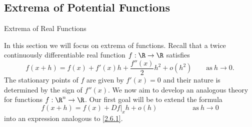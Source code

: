 \documentclass[smaller,hyperref={CJKbookmarks=true}]{beamer}
\begin{document}
\subsection{Extrema of Potential Functions}
\begin{frame}[c]
\begin{spacing}{2.5}
\tableofcontents[sectionstyle=hide,subsectionstyle=show/shaded/hide]
\end{spacing}
\end{frame}
\begin{frame}[c]{Extrema of Real Functions}
\begin{spacing}{1.05}
In this section we will focus on extrema of functions. Recall that a twice
continuously dif{}ferentiable real function $f:\R\to\R$ satisfies
\setcounter{equation}{0}
\begin{equation}\label{2.6.1}
  f(x+h)=f(x)+f'(x)h+\frac{f''(x)}{2}h^2+o(h^2)
  \qquad\text{as}~h\to0.
\end{equation}
The stationary points of $f$ are given by $f'(x)=0$ and their nature is determined by the sign of $f''(x)$. We now aim to develop an analogous theory for functions $f:\R^n\to\R$. Our first goal will be to extend the formula
\[f(x+h)=f(x)+Df|_xh+o(h)\qquad\qquad\quad
\text{as}~h\to0\]
into an expression analogous to \eqref{2.6.1}.
\end{spacing}
\end{frame}
\end{document}
